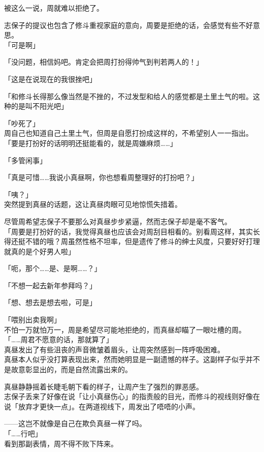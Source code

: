 被这么一说，周就难以拒绝了。

志保子的提议也包含了修斗重视家庭的意向，周要是拒绝的话，会感觉有些不好意思。\\

「可是啊」

「没问题，相信妈吧。肯定会把周打扮得帅气到判若两人的！」

「这是在说现在的我很挫吧」

「和修斗长得那么像当然是不挫的，不过发型和给人的感觉都是土里土气的啦。这种的是叫不阳光吧」

「吵死了」\\

周自己也知道自己土里土气，但周是自愿打扮成这样的，不希望别人一一指出。\\

「要是打扮好的话明明还挺能看的，就是周嫌麻烦……」

「多管闲事」

「真是可惜……我说小真昼啊，你也想看周整理好的打扮吧？」

「咦？」\\

突然提到真昼的话题，这让真昼肉眼可见地惊慌失措着。

尽管周希望志保子不要那么对真昼步步紧逼，然而志保子却是毫不客气。\\

「周要是打扮好的话，我觉得真昼也应该会对周刮目相看的。别看周这样，其实长得还挺不错的哦？周虽然性格不坦率，但是遗传了修斗的绅士风度，只要好好打理就真的是个好男人啦」

「呃，那个……是、是啊……？」

「不想一起去新年参拜吗？」

「想、想去是想去啦，可是」

「喂别出卖我啊」\\

不怕一万就怕万一，周是希望尽可能地拒绝的，而真昼却瞄了一眼吐槽的周。\\

「……周君不愿意的话，那就算了」\\

真昼发出了有些沮丧的声音微皱着眉头，让周突然感到一阵呼吸困难。\\

真昼本人似乎没打算表现出来，然而她明显是一副遗憾的样子。这副样子似乎并不是故意彰显出的，而是自然流露出来的。

真昼静静摇着长睫毛朝下看的样子，让周产生了强烈的罪恶感。\\

志保子丢来了好像在说「让小真昼伤心」的指责般的目光，而修斗的视线则好像在说「放弃才更快一点」。在两道视线下，周发出了唔唔的小声。

——这岂不就像是自己在欺负真昼一样了吗。\\

「……行吧」\\

看到那副表情，周不得不败下阵来。
